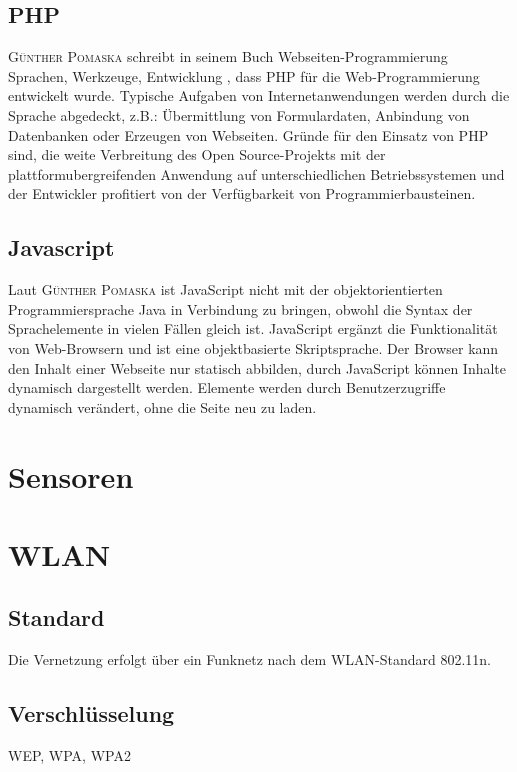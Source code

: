 \subsection{\ac{PHP}}
\textsc{Günther Pomaska} schreibt in seinem Buch Webseiten-Programmierung Sprachen, Werkzeuge, Entwicklung \cite{pomaska2012webseiten-programmierung}, dass \ac{PHP} für die Web-Programmierung entwickelt wurde. Typische Aufgaben von Internetanwendungen werden durch die Sprache abgedeckt, z.B.: Übermittlung von Formulardaten, Anbindung von Datenbanken oder Erzeugen von Webseiten. Gründe für den Einsatz von \ac{PHP} sind, die weite Verbreitung des Open Source-Projekts mit der plattformubergreifenden Anwendung auf unterschiedlichen Betriebssystemen und der Entwickler profitiert von der Verfügbarkeit von Programmierbausteinen.

\subsection{Javascript}
Laut \textsc{Günther Pomaska} \cite{pomaska2012webseiten-programmierung} ist JavaScript nicht mit der objektorientierten Programmiersprache Java in Verbindung zu bringen, obwohl die Syntax der Sprachelemente in vielen Fällen gleich ist. JavaScript ergänzt die Funktionalität von Web-Browsern und ist eine objektbasierte Skriptsprache. Der Browser kann den Inhalt einer Webseite nur statisch abbilden, durch JavaScript können Inhalte dynamisch dargestellt werden. Elemente werden durch Benutzerzugriffe dynamisch verändert, ohne die Seite neu zu laden.

\section{Sensoren}

\section{WLAN}
\subsection{Standard}

Die Vernetzung erfolgt über ein Funknetz nach dem WLAN-Standard 802.11n. 

\subsection{Verschlüsselung}
WEP, WPA, WPA2


